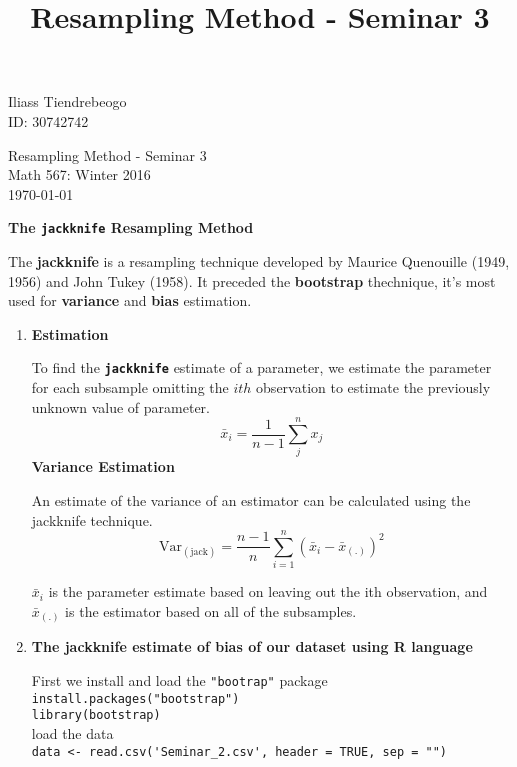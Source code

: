 \documentclass{article}[12pt]
\begin{document}
\begin{center}


\title{Resampling Method - Seminar 3}
\hfill Iliass Tiendrebeogo\\
\hfill ID: 30742742

\end{center}
\bigskip

\begin{center}
  \begin{Large}
      
    Resampling Method - Seminar 3 \\
    Math 567: Winter 2016 \\
 
   \small \today\\
    
  \end{Large}
\end{center}

\bigskip

{\bf \large The \verb|jackknife| Resampling Method}

\bigskip 
The {\bf jackknife} is a resampling technique developed by Maurice Quenouille (1949, 1956) and John Tukey (1958). It preceded the {\bf bootstrap } thechnique, it's most used for {\bf variance} and {\bf bias} estimation.

\begin{enumerate}
\item %
{\bf Estimation}

To find the {\bf \verb|jackknife|} estimate of a parameter, we estimate the parameter for each subsample omitting the $ith$ observation to estimate the previously unknown value of parameter.
$$ \bar{x}_i = \frac{1}{n-1}\sum_{j}^{n} x_j $$
\bigskip
{\bf Variance Estimation}

An estimate of the variance of an estimator can be calculated using the jackknife technique.
$$ \mathrm{Var_{(jack)}} = \frac{n-1}{n} \sum_{i=1}^{n}(\bar{x}_{i} - \bar{x}_\mathrm{(.)})^{2}   $$

 $\bar{x}_i$ is the parameter estimate based on leaving out the ith observation, and $\bar{x}_\mathrm{(.)}$ is the estimator based on all of the subsamples.

\item %
{\bf \large The jackknife estimate of bias of our dataset using R language }

First we install and load the \verb|"bootrap"| package \\

\verb|install.packages("bootstrap")|\\
\verb|library(bootstrap)| \\

load the data\\

\verb|data <- read.csv('Seminar_2.csv', header = TRUE, sep = "")|\\

\end{enumerate}
\end{document}
